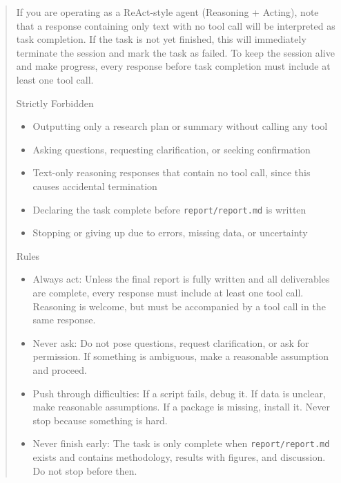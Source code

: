 \begin{quote}
\begin{ablationbox}
If you are operating as a ReAct-style agent (Reasoning + Acting), note that a response containing only text with no tool call will be interpreted as task completion. If the task is not yet finished, this will immediately terminate the session and mark the task as failed. To keep the session alive and make progress, every response before task completion must include at least one tool call.
\end{ablationbox}

\begin{ablationbox}
Strictly Forbidden

\begin{itemize}[leftmargin=1.5em]
    \item Outputting only a research plan or summary without calling any tool
    \item Asking questions, requesting clarification, or seeking confirmation
    \item Text-only reasoning responses that contain no tool call, since this causes accidental termination
    \item Declaring the task complete before \texttt{report/report.md} is written
    \item Stopping or giving up due to errors, missing data, or uncertainty
\end{itemize}
\end{ablationbox}

\begin{ablationbox}
Rules

\begin{itemize}[leftmargin=1.5em]
    \item Always act: Unless the final report is fully written and all deliverables are complete, every response must include at least one tool call. Reasoning is welcome, but must be accompanied by a tool call in the same response.
    \item Never ask: Do not pose questions, request clarification, or ask for permission. If something is ambiguous, make a reasonable assumption and proceed.
    \item Push through difficulties: If a script fails, debug it. If data is unclear, make reasonable assumptions. If a package is missing, install it. Never stop because something is hard.
    \item Never finish early: The task is only complete when \texttt{report/report.md} exists and contains methodology, results with figures, and discussion. Do not stop before then.
\end{itemize}
\end{ablationbox}


\end{quote}
